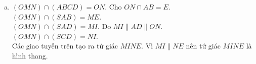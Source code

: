 \begin{bt}
{\begin{enumerate}[a.]
Ta có $\heva{&IH \parallel SA \\&HK \parallel AB\\& IH \cap HK = H}$ do đó $(IHK) \parallel(SAB)$.\\
Vậy $\heva{&IJ \subset(IHK) \\ &(IHK) \parallel(SAB)} \Rightarrow IJ \parallel(SAB)$.
\item $(OMN) \cap(ABCD)=ON$. Cho $ON \cap AB=E$.\\
$(OMN) \cap(SAB)=ME$.\\
$(OMN) \cap(SAD)=MI$. Do $MI \parallel AD \parallel ON$.\\
$(OMN) \cap(SCD)=NI$.\\
Các giao tuyến trên tạo ra tứ giác $MINE$. Vì $MI \parallel NE$ nên tứ giác $MINE$ là hình thang.
\end{enumerate}
}
\end{bt}

